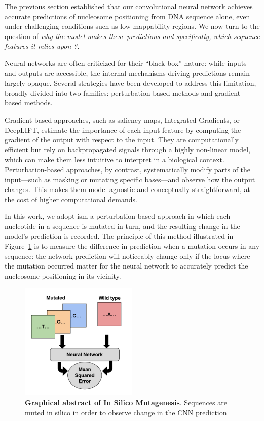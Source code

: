 \documentclass[11pt]{book}
\begin{document}
The previous section established that our convolutional neural network achieves accurate predictions of nucleosome positioning from DNA sequence alone, even under challenging conditions such as low-mappability regions. We now turn to the question of \textit{why the model makes these predictions and specifically, which sequence features it relies upon ?}.

Neural networks are often criticized for their “black box” nature: while inputs and outputs are accessible, the internal mechanisms driving predictions remain largely opaque. Several strategies have been developed to address this limitation, broadly divided into two families: perturbation-based methods and gradient-based methods.

Gradient-based approaches, such as saliency maps, Integrated Gradients, or DeepLIFT, estimate the importance of each input feature by computing the gradient of the output with respect to the input. They are computationally efficient but rely on backpropagated signals through a highly non-linear model, which can make them less intuitive to interpret in a biological context.
Perturbation-based approaches, by contrast, systematically modify parts of the input—such as masking or mutating specific bases—and observe how the output changes. This makes them model-agnostic and conceptually straightforward, at the cost of higher computational demands. 

In this work, we adopt \gls{ism} a perturbation-based approach in which each nucleotide in a sequence is mutated in turn, and the resulting change in the model’s prediction is recorded.  The principle of this method illustrated in Figure~\ref{fig:graph_mut} is to measure the difference in prediction when a mutation occurs in any sequence: the network prediction will noticeably change only if the locus where the mutation occurred matter for the neural network to accurately predict the nucleosome positioning in its vicinity.

\begin{figure}[htbp]
    \centering
    \includegraphics[width=0.5\textwidth]{Figures/Results/graphic_mutasome.pdf}
    \caption{\textbf{Graphical abstract of In Silico Mutagenesis}. Sequences are muted in silico in order to observe change in the CNN prediction}
    \label{fig:graph_mut}
\end{figure}
\end{document}
